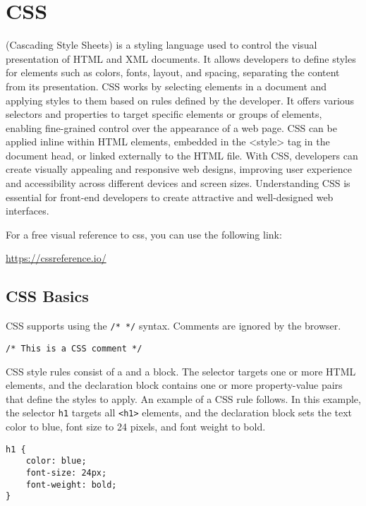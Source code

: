 \chapter{CSS}
\thispagestyle{fancy}
\lstset{}\lstset{language=html, style=cssstyle}

 (Cascading Style Sheets) is a styling language used to control the visual presentation of HTML and XML documents. It allows developers to define styles for elements such as colors, fonts, layout, and spacing, separating the content from its presentation. CSS works by selecting elements in a document and applying styles to them based on rules defined by the developer. It offers various selectors and properties to target specific elements or groups of elements, enabling fine-grained control over the appearance of a web page. CSS can be applied inline within HTML elements, embedded in the <style> tag in the document head, or linked externally to the HTML file. With CSS, developers can create visually appealing and responsive web designs, improving user experience and accessibility across different devices and screen sizes. Understanding CSS is essential for front-end developers to create attractive and well-designed web interfaces.

\begin{urlbox}
For a free visual reference to css, you can use the following link:

\url{https://cssreference.io/}
\end{urlbox}







\section{CSS Basics}

CSS supports  using the \texttt{/* */} syntax. Comments are ignored by the browser.
\begin{lstlisting}
/* This is a CSS comment */
\end{lstlisting}

CSS style rules consist of a  and a  block. The selector targets one or more HTML elements, and the declaration block contains one or more property-value pairs that define the styles to apply. An example of a CSS rule follows. In this example, the selector \texttt{h1} targets all \texttt{<h1>} elements, and the declaration block sets the text color to blue, font size to 24 pixels, and font weight to bold. 
\begin{lstlisting}
h1 {
    color: blue;
    font-size: 24px;
    font-weight: bold;
}
\end{lstlisting}

